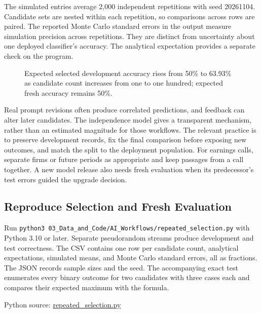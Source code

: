 The simulated entries average 2,000 independent repetitions with seed
20261104. Candidate sets are nested within each repetition, so
comparisons across rows are paired. The reported Monte Carlo standard
errors in the output measure simulation precision across repetitions.
They are distinct from uncertainty about one deployed classifier's
accuracy. The analytical expectation provides a separate check on the
program.

\begin{figure}[htbp]
\centering

\caption{Expected selected development accuracy rises from 50\% to 63.93\% as candidate count increases from one to one hundred; expected fresh accuracy remains 50\%.}\label{fig:M07_repeated_selection}
\end{figure}

Real prompt revisions often produce correlated predictions, and feedback
can alter later candidates. The independence model gives a transparent
mechanism, rather than an estimated magnitude for those workflows. The
relevant practice is to preserve development records, fix the final
comparison before exposing new outcomes, and match the split to the
deployment population. For earnings calls, separate firms or future
periods as appropriate and keep passages from a call together. A new
model release also needs fresh evaluation when its predecessor's test
errors guided the upgrade decision.

\hypertarget{M07-reproduce-selection-and-fresh-evaluation}{%
\subsection{Reproduce Selection and Fresh
Evaluation}\label{M07-reproduce-selection-and-fresh-evaluation}}

\noindent \noindent Run
\texttt{python3\ 03\_Data\_and\_Code/AI\_Workflows/repeated\_selection.py}
with Python 3.10 or later. Separate pseudorandom streams produce
development and test correctness. The CSV contains one row per candidate
count, analytical expectations, simulated means, and Monte Carlo
standard errors, all as fractions. The JSON records sample sizes and the
seed. The accompanying exact test enumerates every binary outcome for
two candidates with three cases each and compares their expected maximum
with the formula.

\FloatBarrier
{}
Python source:
\href{../03_Data_and_Code/AI_Workflows/repeated_selection.py}{repeated\_selection.py}

